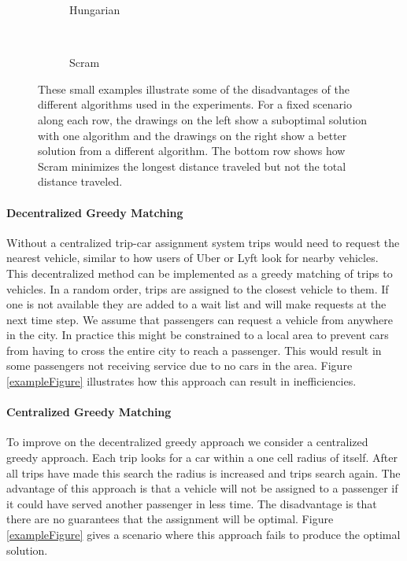 \documentclass[letterpaper]{article}
\begin{document}
\begin{figure}
\begin{subfigure}[t]{0.2\textwidth}
\caption{Hungarian}
\end{subfigure}
~
\begin{subfigure}[t]{0.2\textwidth}
\caption{Scram}
\end{subfigure}
\label{smallExampleFigure}
\caption{These small examples illustrate some of the disadvantages of the different algorithms used in the experiments. For a fixed scenario along each row, the drawings on the left show a suboptimal solution with one algorithm and the drawings on the right show a better solution from a different algorithm. The bottom row shows how Scram minimizes the longest distance traveled but not the total distance traveled.}
\end{figure}

\paragraph{Decentralized Greedy Matching}
Without a centralized trip-car assignment system trips would need to request the nearest vehicle, similar to how users of Uber or Lyft look for nearby vehicles. This decentralized method can be implemented as a greedy matching of trips to vehicles. In a random order, trips are assigned to the closest vehicle to them. If one is not available they are added to a wait list and will make requests at the next time step. We assume that passengers can request a vehicle from anywhere in the city. In practice this might be constrained to a local area to prevent cars from having to cross the entire city to reach a passenger. This would result in some passengers not receiving service due to no cars in the area. Figure \ref{exampleFigure} illustrates how this approach can result in inefficiencies.


\paragraph{Centralized Greedy Matching}
To improve on the decentralized greedy approach we consider a centralized greedy approach. Each trip looks for a car within a one cell radius of itself. After all trips have made this search the radius is increased and trips search again. The advantage of this approach is that a vehicle will not be assigned to a passenger if it could have served another passenger in less time. The disadvantage is that there are no guarantees that the assignment will be optimal. Figure \ref{exampleFigure} gives a scenario where this approach fails to produce the optimal solution.
\end{document}
